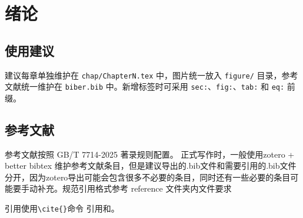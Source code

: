 \chapter{绪论}

\section{使用建议}
建议每章单独维护在 \texttt{chap/ChapterN.tex} 中，图片统一放入 \texttt{figure/} 目录，参考文献统一维护在 \texttt{biber.bib} 中。新增标签时可采用 \texttt{sec:}、\texttt{fig:}、\texttt{tab:} 和 \texttt{eq:} 前缀。

\section{参考文献}
参考文献按照 GB/T 7714-2025 著录规则配置。
正式写作时，一般使用zotero + better bibtex 维护参考文献条目，但是建议导出的.bib文件和需要引用的.bib文件分开，因为zotero导出可能会包含很多不必要的条目，同时还有一些必要的条目可能要手动补充。规范引用格式参考 reference 文件夹内文件要求

引用使用\verb|\cite{}|命令 引用\cite{Dolgov2010}和\cite{Bojarski2016,Karaman2012,Wu1996}。